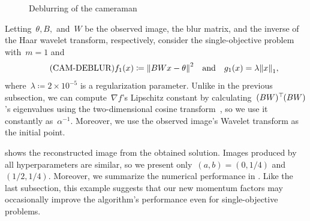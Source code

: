 \documentclass[../main]{subfiles}
\begin{document}
\begin{figure}[htpb]
\begin{minipage}[b]{.45\hsize}
    \end{minipage}
    \caption{Deblurring of the cameraman}
\end{figure}

Letting~$\theta, B,$ and~$W$ be the observed image, the blur matrix, and the inverse of the Haar wavelet transform, respectively, consider the single-objective problem~ with~$m = 1$ and
\begin{equation} \label{eq:cam_deblur} \tag{CAM-DEBLUR}
    f_1(x) \coloneqq \norm*{BWx - \theta}^2 \eqand g_1(x)=\lambda \norm*{x}_1
,\end{equation} 
where~$\lambda \coloneqq 2 \times 10^{-5}$ is a regularization parameter.
Unlike in the previous subsection, we can compute~$\nabla f$'s Lipschitz constant by calculating~$(BW)^\top\hspace{-1pt}(BW)$'s eigenvalues using the two-dimensional cosine transform~\cite{Hansen2006}, so we use it constantly as~$\alpha^{-1}$.
Moreover, we use the observed image's Wavelet transform as the initial point.

 shows the reconstructed image from the obtained solution.
Images produced by all hyperparameters are similar, so we present only~$(a, b) = (0, 1 / 4)$ and~$(1 / 2, 1 / 4)$.
Moreover, we summarize the numerical performance in .
Like the last subsection, this example suggests that our new momentum factors may occasionally improve the algorithm's performance even for single-objective problems.
\end{document}
